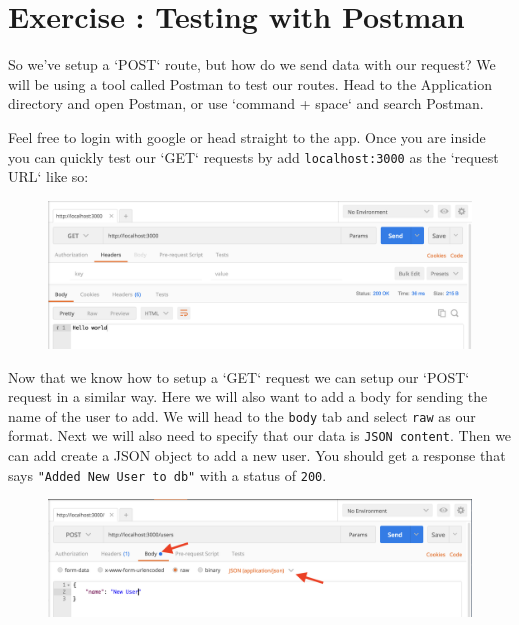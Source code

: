 \documentclass{42-en}
\begin{document}
\chapter{Exercise \exercicenumber: Testing with Postman}

    So we've setup a `POST` route, but how do we send data with our request? We will be using a tool called Postman to test our routes. Head to the Application directory and open Postman, or use  `command + space` and search Postman.

    Feel free to login with google or head straight to the app. Once you are inside you can quickly test our `GET` requests by add \texttt{localhost:3000} as the `request URL` like so:

    \begin{figure}[H]
        \begin{center}
            \includegraphics[width=14cm]{WEB/postman_GET.png}
        \end{center}
    \end{figure}

Now that we know how to setup a `GET` request we can setup our `POST` request in a similar way. Here we will also want to add a body for sending the name of the user to add. We will head to the \texttt{body} tab and select \texttt{raw} as our format. Next we will also need to specify that our data is \texttt{JSON content}. Then we can add create a JSON object to add a new user. You should get a response that says \texttt{"Added New User to db"} with a status of \texttt{200}.

    \begin{figure}[H]
        \begin{center}
            \includegraphics[width=14cm]{WEB/postman_POST.png}
        \end{center}
    \end{figure}
\end{document}
